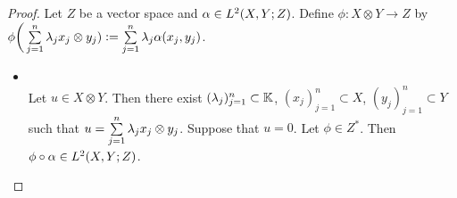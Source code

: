 \documentclass{book}
\begin{document}
\begin{proof}
	Let $Z$ be a vector space and $\alpha \in L^2(X, Y; Z)$. Define $\phi: X \otimes Y \rightarrow Z$ by $\phi \bigg( \sum\limits_{j=1}^n \lambda_j x_j \otimes y_j) \vcentcolon= \sum\limits_{j =1}^n \lambda_j \alpha(x_j, y_j)$.  
	\begin{itemize}
		\item {} \\
		Let $u \in X \otimes Y$. Then there exist $(\lambda_j)_{j=1}^n \subset \mathbb{K}$, $(x_j)_{j=1}^n \subset X$, $(y_j)_{j=1}^n \subset Y$ such that $u = \sum\limits_{j=1}^n \lambda_j x_j \otimes y_j$. Suppose that $u = 0$. Let $\phi \in Z^*$. Then $\phi \circ \alpha \in L^2(X,Y; Z)$.  
	\end{itemize}
\end{proof}
\end{document}
